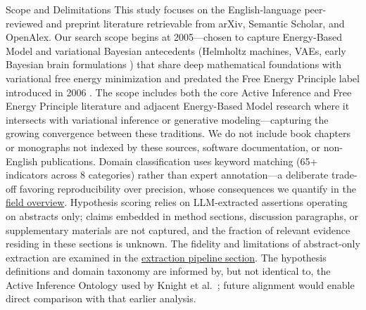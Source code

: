 \documentclass[
  ignorenonframetext,
]{beamer}
\begin{document}
\begin{frame}{Scope and Delimitations}
\protect{}\label{scope-and-delimitations}
This study focuses on the English-language peer-reviewed and preprint
literature retrievable from arXiv, Semantic Scholar, and OpenAlex. Our
search scope begins at 2005---chosen to capture Energy-Based Model and
variational Bayesian antecedents (Helmholtz machines, VAEs, early
Bayesian brain formulations
\citep{dayan1995helmholtz, lecun2006tutorial}) that share deep
mathematical foundations with variational free energy minimization and
predated the Free Energy Principle label introduced in 2006
\citep{friston2006free}. The scope includes both the core Active
Inference and Free Energy Principle literature and adjacent Energy-Based
Model research where it intersects with variational inference or
generative modeling---capturing the growing convergence between these
traditions. We do not include book chapters or monographs not indexed by
these sources, software documentation, or non-English publications.
Domain classification uses keyword matching (65+ indicators across 8
categories) rather than expert annotation---a deliberate trade-off
favoring reproducibility over precision, whose consequences we quantify
in the \hyperref[sec:field_overview]{field overview}. Hypothesis scoring
relies on LLM-extracted assertions operating on abstracts only; claims
embedded in method sections, discussion paragraphs, or supplementary
materials are not captured, and the fraction of relevant evidence
residing in these sections is unknown. The fidelity and limitations of
abstract-only extraction are examined in the
\hyperref[sec:extraction_pipeline]{extraction pipeline section}. The
hypothesis definitions and domain taxonomy are informed by, but not
identical to, the Active Inference Ontology used by Knight et
al.~\citep{knight2022fep}; future alignment would enable direct
comparison with that earlier analysis.
\end{frame}
\end{document}
